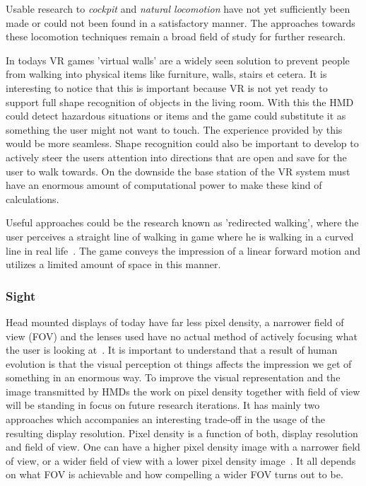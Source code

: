 Usable research to \textit{cockpit} and \textit{natural locomotion} have not yet sufficiently been made or could not been found in a satisfactory manner. The approaches towards these locomotion techniques remain a broad field of study for further research. 

In todays VR games 'virtual walls' are a widely seen solution to prevent people from walking into physical items like furniture, walls, stairs et cetera. It is interesting to notice that this is important because VR is not yet ready to support full shape recognition of objects in the living room. With this the HMD could detect hazardous situations or items and the game could substitute it as something the user might not want to touch. The experience provided by this would be more seamless.\newline
Shape recognition could also be important to develop to actively steer the users attention into directions that are open and save for the user to walk towards. On the downside the base station of the VR system must have an enormous amount of computational power to make these kind of calculations.

Useful approaches could be the research known as 'redirected walking', where the user perceives a straight line of walking in game where he is walking in a curved line in real life~\cite{razzaque2001redirected}. The game conveys the impression of a linear forward motion and utilizes a limited amount of space in this manner.

\subsubsection{Sight}

Head mounted displays of today have far less pixel density, a narrower field of view (FOV) and the lenses used have no actual method of actively focusing what the user is looking at~\cite{online:oculusKeynote}.\newline
It is important to understand that a result of human evolution is that the visual perception ot things affects the impression we get of something in an enormous way. \newline
To improve the visual representation and the image transmitted by HMDs the work on pixel density together with field of view will be standing in focus on future research iterations. It has mainly two approaches which accompanies an interesting trade-off in the usage of the resulting display resolution. Pixel density is a function of both, display resolution and field of view. One can have a higher pixel density image with a narrower field of view, or a wider field of view with a lower pixel density image~\cite{online:oculusKeynote}. \newline
It all depends on what FOV is achievable and how compelling a wider FOV turns out to be.

